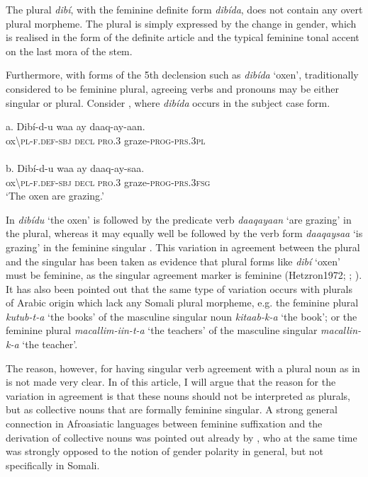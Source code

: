 \documentclass[output=paper]{langsci/langscibook}
\begin{document}
The plural \textit{dibí}, with the feminine definite form \textit{dibída}, does not contain any overt plural morpheme. The plural is simply expressed by the change in gender, which is realised in the form of the definite article and the typical feminine tonal accent on the last mora of the stem. 

Furthermore, with forms of the 5th declension such as \textit{dibída} ‘oxen’, traditionally considered to be feminine plural, agreeing verbs and pronouns may be either singular or plural. Consider , where \textit{dibída} occurs in the subject case form.

\ea
\ea
\gll \textup{a. } Dibí-d-u             waa  ay{\rmfnm}   daaq-ay-aan.   \\
        ox{\textbackslash}\textsc{pl-f.def-sbj  decl   pro.3}   graze-\textsc{prog-prs.3pl}\\
\ex
{}\\
\gll \textup{b.  }Dibí-d-u        waa  ay   daaq-ay-saa.    \\
       ox{\textbackslash}\textsc{pl-f.def-sbj  decl   pro.3}  graze-\textsc{prog-prs.3fsg}\\
\glt   ‘The oxen are grazing.’
\z
\z


In  \textit{dibídu} ‘the oxen’ is followed by the predicate verb \textit{daaqayaan} ‘are grazing’ in the plural, whereas it may equally well be followed by the verb form \textit{daaqaysaa} ‘is grazing’ in the feminine singular . This variation in agreement between the plural and the singular has been taken as evidence that plural forms like \textit{dibí} ‘oxen’ must be feminine, as the singular agreement marker is feminine (\citealt{259--260}{Hetzron1972}; \citealt[391--393]{ZwickyPullum1983}; \citealt[134--137]{Lecarme2002}). It has also been pointed out that the same type of variation occurs with plurals of Arabic origin which lack any Somali plural morpheme, e.g. the feminine plural \textit{kutub-t-a} ‘the books’ of the masculine singular noun \textit{kitaab-k-a} ‘the book’; or the feminine plural \textit{macallim-iin-t-a} ‘the teachers’ of the masculine singular \textit{macallin-k-a} ‘the teacher’.

The reason, however, for having singular verb agreement with a plural noun as in  is not made very clear. In  of this article, I will argue that the reason for the variation in agreement is that these nouns should not be interpreted as plurals, but as collective nouns that are formally feminine singular. A strong general connection in Afroasiatic languages between feminine suffixation and the derivation of collective nouns was pointed out already by \citet{Speiser1938}, who at the same time was strongly opposed to the notion of gender polarity in general, but not specifically in Somali.
\end{document}
